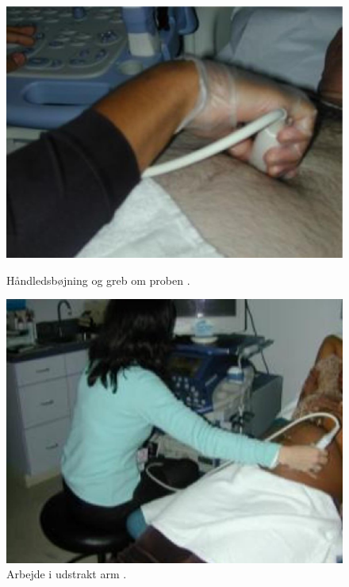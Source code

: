 \begin{figure}[H]
  \begin{minipage}{0.49\textwidth}
    \centering
      \includegraphics[width=\textwidth]{Figurer/wrist.jpg}
      \caption{Håndledsbøjning og greb om proben \cite{31}.}
    \label{wrist}
  \end{minipage}
  \hspace{0.02\textwidth}
  \begin{minipage}{0.47\textwidth}
    \centering
      \includegraphics[width=\textwidth]{Figurer/arm.jpg}
      \caption{Arbejde i udstrakt arm \cite{31}.}
    \label{udstraktArm}
  \end{minipage}
\end{figure}

